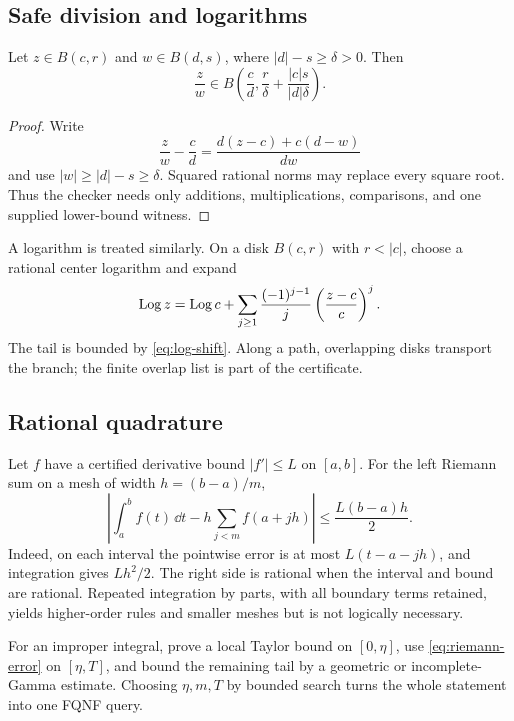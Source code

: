 \subsection{Safe division and logarithms}

\begin{lemma}\label{lem:ball-division}
Let \(z\in B(c,r)\) and \(w\in B(d,s)\), where
\(|d|-s\ge\delta>0\).  Then
\[
 \frac zw\in B\left(\frac cd,
 \frac{r}{\delta}+\frac{|c|s}{|d|\delta}\right).
\]
\end{lemma}

\begin{proof}
Write
\[
 \frac zw-\frac cd=\frac{d(z-c)+c(d-w)}{dw}
\]
and use \(|w|\ge|d|-s\ge\delta\).  Squared rational norms may replace every
square root.  Thus the checker needs only additions, multiplications,
comparisons, and one supplied lower-bound witness.
\end{proof}

A logarithm is treated similarly.  On a disk
\(B(c,r)\) with \(r<|c|\), choose a rational center logarithm and expand
\[
 \operatorname{Log} z=\operatorname{Log} c+\sum_{j\ge1}\frac{(-1)^{j-1}}j
       \left(\frac{z-c}{c}\right)^j.
\]
The tail is bounded by \cref{eq:log-shift}.  Along a path, overlapping disks
transport the branch; the finite overlap list is part of the certificate.

\subsection{Rational quadrature}

Let \(f\) have a certified derivative bound \(|f'|\le L\) on \([a,b]\).
For the left Riemann sum on a mesh of width \(h=(b-a)/m\),
\begin{equation}\label{eq:riemann-error}
 \left|\int_a^b f(t)\,\dd t-h\sum_{j<m}f(a+jh)\right|
 \le \frac{L(b-a)h}{2}.
\end{equation}
Indeed, on each interval the pointwise error is at most \(L(t-a-jh)\), and
integration gives \(Lh^2/2\).  The right side is rational when the interval and
bound are rational.  Repeated integration by parts, with all boundary terms
retained, yields higher-order rules and smaller meshes but is not logically
necessary.

For an improper integral, prove a local Taylor bound on \([0,\eta]\), use
\cref{eq:riemann-error} on \([\eta,T]\), and bound the remaining tail by a
geometric or incomplete-Gamma estimate.  Choosing \(\eta,m,T\) by bounded
search turns the whole statement into one FQNF query.

